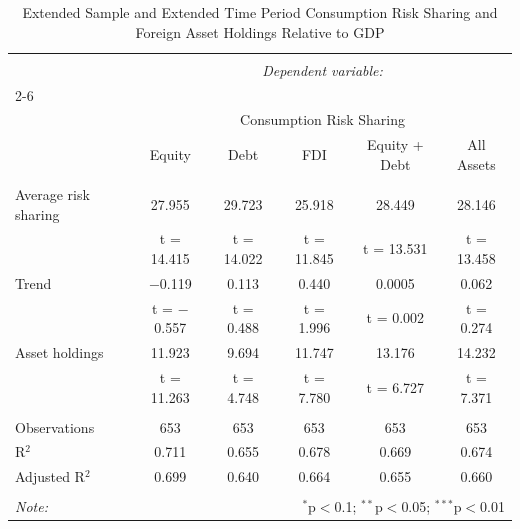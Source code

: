 
\begin{table}[!htbp] \centering 
  \caption{Extended Sample and Extended Time Period Consumption Risk Sharing and Foreign Asset Holdings Relative to GDP} 
  \label{} 
\begin{tabular}{@{\extracolsep{5pt}}lccccc} 
\\[-1.8ex]\hline 
\hline \\[-1.8ex] 
 & \multicolumn{5}{c}{\textit{Dependent variable:}} \\ 
\cline{2-6} 
\\[-1.8ex] & \multicolumn{5}{c}{Consumption Risk Sharing} \\ 
 & Equity & Debt & FDI & Equity + Debt & All Assets \\ 
\hline \\[-1.8ex] 
 Average risk sharing & 27.955 & 29.723 & 25.918 & 28.449 & 28.146 \\ 
  & t = 14.415 & t = 14.022 & t = 11.845 & t = 13.531 & t = 13.458 \\ 
  Trend & $-$0.119 & 0.113 & 0.440 & 0.0005 & 0.062 \\ 
  & t = $-$0.557 & t = 0.488 & t = 1.996 & t = 0.002 & t = 0.274 \\ 
  Asset holdings & 11.923 & 9.694 & 11.747 & 13.176 & 14.232 \\ 
  & t = 11.263 & t = 4.748 & t = 7.780 & t = 6.727 & t = 7.371 \\ 
 \hline \\[-1.8ex] 
Observations & 653 & 653 & 653 & 653 & 653 \\ 
R$^{2}$ & 0.711 & 0.655 & 0.678 & 0.669 & 0.674 \\ 
Adjusted R$^{2}$ & 0.699 & 0.640 & 0.664 & 0.655 & 0.660 \\ 
\hline 
\hline \\[-1.8ex] 
\textit{Note:}  & \multicolumn{5}{r}{$^{*}$p$<$0.1; $^{**}$p$<$0.05; $^{***}$p$<$0.01} \\ 
\end{tabular} 
\end{table} 
